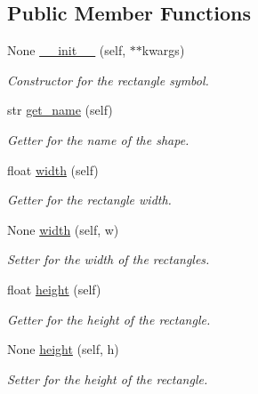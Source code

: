 \subsection*{Public Member Functions}
\begin{DoxyCompactItemize}
\item 
None \mbox{\hyperlink{classbridges_1_1rectangle_1_1_rectangle_aa332e06ef9abf830af50eda608598811}{\+\_\+\+\_\+init\+\_\+\+\_\+}} (self, $\ast$$\ast$kwargs)
\begin{DoxyCompactList}\small\item\em Constructor for the rectangle symbol. \end{DoxyCompactList}\item 
str \mbox{\hyperlink{classbridges_1_1rectangle_1_1_rectangle_a1de16beb003cfd25e5357116bbc4dc78}{get\+\_\+name}} (self)
\begin{DoxyCompactList}\small\item\em Getter for the name of the shape. \end{DoxyCompactList}\item 
float \mbox{\hyperlink{classbridges_1_1rectangle_1_1_rectangle_a54dd44fc2660be14ae001536b2434898}{width}} (self)
\begin{DoxyCompactList}\small\item\em Getter for the rectangle width. \end{DoxyCompactList}\item 
None \mbox{\hyperlink{classbridges_1_1rectangle_1_1_rectangle_a700c6c37ad4b1da06891656401313481}{width}} (self, w)
\begin{DoxyCompactList}\small\item\em Setter for the width of the rectangles. \end{DoxyCompactList}\item 
float \mbox{\hyperlink{classbridges_1_1rectangle_1_1_rectangle_a51cfc55864a3b7643cfc6e3ba9dca161}{height}} (self)
\begin{DoxyCompactList}\small\item\em Getter for the height of the rectangle. \end{DoxyCompactList}\item 
None \mbox{\hyperlink{classbridges_1_1rectangle_1_1_rectangle_afb7a48d758122bc02a2c53e362f65b7e}{height}} (self, h)
\begin{DoxyCompactList}\small\item\em Setter for the height of the rectangle. \end{DoxyCompactList}\item 
$$
\end{DoxyCompactItemize}
